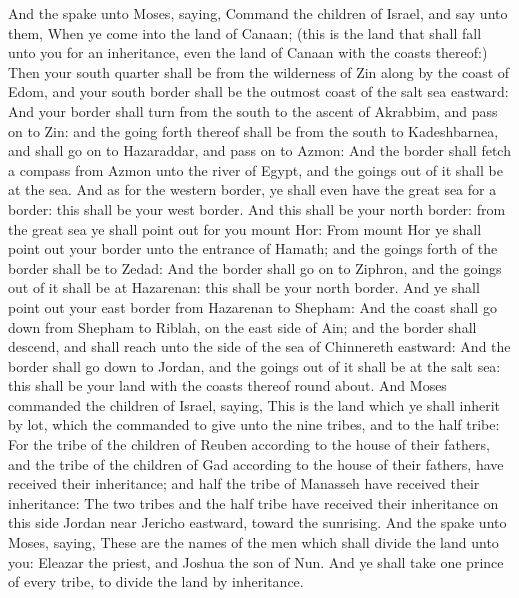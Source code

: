 \begin{biblechapter} %
 And the \LORD spake unto Moses, saying,
\verse Command the children of Israel, and say unto them, When ye come into the land of Canaan; (this is the land that shall fall unto you for an inheritance, even the land of Canaan with the coasts thereof:)
\verse Then your south quarter shall be from the wilderness of Zin along by the coast of Edom, and your south border shall be the outmost coast of the salt sea eastward:
\verse And your border shall turn from the south to the ascent of Akrabbim, and pass on to Zin: and the going forth thereof shall be from the south to Kadeshbarnea, and shall go on to Hazaraddar, and pass on to Azmon:
\verse And the border shall fetch a compass from Azmon unto the river of Egypt, and the goings out of it shall be at the sea.
\verse And as for the western border, ye shall even have the great sea for a border: this shall be your west border.
\verse And this shall be your north border: from the great sea ye shall point out for you mount Hor:
\verse From mount Hor ye shall point out your border unto the entrance of Hamath; and the goings forth of the border shall be to Zedad:
\verse And the border shall go on to Ziphron, and the goings out of it shall be at Hazarenan: this shall be your north border.
\verse And ye shall point out your east border from Hazarenan to Shepham:
\verse And the coast shall go down from Shepham to Riblah, on the east side of Ain; and the border shall descend, and shall reach unto the side of the sea of Chinnereth eastward:
\verse And the border shall go down to Jordan, and the goings out of it shall be at the salt sea: this shall be your land with the coasts thereof round about.
\verse And Moses commanded the children of Israel, saying, This is the land which ye shall inherit by lot, which the \LORD commanded to give unto the nine tribes, and to the half tribe:
\verse For the tribe of the children of Reuben according to the house of their fathers, and the tribe of the children of Gad according to the house of their fathers, have received their inheritance; and half the tribe of Manasseh have received their inheritance:
\verse The two tribes and the half tribe have received their inheritance on this side Jordan near Jericho eastward, toward the sunrising.
\verse And the \LORD spake unto Moses, saying,
\verse These are the names of the men which shall divide the land unto you: Eleazar the priest, and Joshua the son of Nun.
\verse And ye shall take one prince of every tribe, to divide the land by inheritance.

\end{biblechapter}

